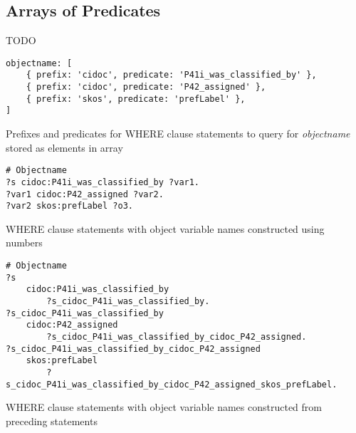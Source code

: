 \subsection{Arrays of Predicates}

TODO

%
\begin{listing}[htbp]
    \begin{verbatim}
objectname: [
    { prefix: 'cidoc', predicate: 'P41i_was_classified_by' },
    { prefix: 'cidoc', predicate: 'P42_assigned' },
    { prefix: 'skos', predicate: 'prefLabel' },
]
    \end{verbatim}
    \caption{Prefixes and predicates for WHERE clause statements to query for \textit{objectname} stored as elements in array}
    \label{lst:where_statements_array_predicates}
\end{listing}
%
\begin{listing}[htbp]
    \begin{verbatim}
# Objectname
?s cidoc:P41i_was_classified_by ?var1.
?var1 cidoc:P42_assigned ?var2.
?var2 skos:prefLabel ?o3.
    \end{verbatim}
    \caption{WHERE clause statements with object variable names constructed using numbers}
    \label{lst:where_statements_objects_numbers}
\end{listing}
\begin{listing}[htbp]
    \begin{verbatim}
# Objectname
?s
    cidoc:P41i_was_classified_by
        ?s_cidoc_P41i_was_classified_by.
?s_cidoc_P41i_was_classified_by
    cidoc:P42_assigned
        ?s_cidoc_P41i_was_classified_by_cidoc_P42_assigned.
?s_cidoc_P41i_was_classified_by_cidoc_P42_assigned
    skos:prefLabel
        ?s_cidoc_P41i_was_classified_by_cidoc_P42_assigned_skos_prefLabel.
    \end{verbatim}
    \caption{WHERE clause statements with object variable names constructed from preceding statements}
    \label{lst:where_statements_objects_long}
\end{listing}
